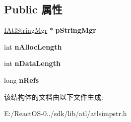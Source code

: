 \subsection*{Public 属性}
\begin{DoxyCompactItemize}
\item 
\mbox{\label{struct_a_t_l_1_1_c_string_data_a8fb611c15b92041efdb86ae5704f568a}} 
\hyperlink{class_a_t_l_1_1_i_atl_string_mgr}{I\+Atl\+String\+Mgr} $\ast$ {\bfseries p\+String\+Mgr}
\item 
\mbox{\label{struct_a_t_l_1_1_c_string_data_a383e82d3541e430144da054dfd7ada1d}} 
int {\bfseries n\+Alloc\+Length}
\item 
\mbox{\label{struct_a_t_l_1_1_c_string_data_a609c332854feb48e7fd5a54682afedb7}} 
int {\bfseries n\+Data\+Length}
\item 
\mbox{\label{struct_a_t_l_1_1_c_string_data_af0480bc167633e9926f2dff89dba4e6f}} 
long {\bfseries n\+Refs}
\end{DoxyCompactItemize}


该结构体的文档由以下文件生成\+:\begin{DoxyCompactItemize}
\item 
E\+:/\+React\+O\+S-\/0../sdk/lib/atl/atlsimpstr.\+h\end{DoxyCompactItemize}
